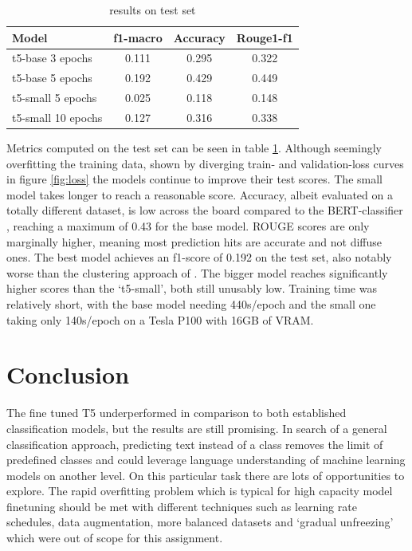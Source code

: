 \documentclass[11pt,a4paper,onecolumn,oneside,notitlepage]{article}
\begin{document}
		\begin{table}
			\begin{center}
				\begin{tabular}{|l|c|c|c|}
					\hline
                    \textbf{Model} & \textbf{f1-macro}  & \textbf{Accuracy} & \textbf{Rouge1-f1}\\
					\hline
					\hline
					\hline
					t5-base 3 epochs & 0.111 & 0.295 & 0.322\\
                    \rowcolor{ForestGreen}
					t5-base 5 epochs & 0.192 & 0.429 & 0.449\\
					\hline
                    t5-small 5 epochs & 0.025 & 0.118 & 0.148\\
                    \hline
					t5-small 10 epochs & 0.127 & 0.316 & 0.338\\
					\hline
				\end{tabular}
			\end{center}
			
			\caption{results on test set}\label{tab1}
		\end{table}


Metrics computed on the test set can be seen in table \ref{tab1}. Although seemingly overfitting the training data, shown by diverging train- and validation-loss curves in figure \ref{fig:loss} the models continue to improve their test scores. The small model takes longer to reach a reasonable score. Accuracy, albeit evaluated on a totally different dataset, is low across the board compared to the BERT-classifier \citep{bert_frame_ident} , reaching  a maximum of 0.43 for the base model. ROUGE scores are only marginally higher, meaning most prediction hits are accurate and not diffuse ones.
The best model achieves an f1-score of 0.192 on the test set, also notably worse than the clustering approach of \citep{webis_task_paper}. The bigger model reaches significantly higher scores than the ‘t5-small’, both still unusably low. Training time was relatively short, with the base model needing 440s/epoch and the small one taking only 140s/epoch on a Tesla P100 with 16GB of VRAM.


\section{Conclusion}
The fine tuned T5 underperformed in comparison to both established classification models, but the results are still promising. In search of a general classification approach, predicting text instead of a class removes the limit of predefined classes and could leverage language understanding of machine learning models on another level. On this particular task there are lots of opportunities to explore. The rapid overfitting problem which is typical for high capacity model finetuning should be met with different techniques such as learning rate schedules, data augmentation, more balanced datasets and ‘gradual unfreezing’ which were out of scope for this assignment. \\
\end{document}
